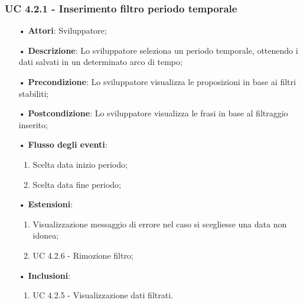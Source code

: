 \subsubsection{UC 4.2.1 - Inserimento filtro periodo temporale}
\begin{itemize}
\item[•]\textbf{Attori}: Sviluppatore;
\item[•]\textbf{Descrizione}: Lo sviluppatore seleziona un periodo temporale, ottenendo i dati salvati in un determinato arco di tempo;
\item[•]\textbf{Precondizione}: Lo sviluppatore visualizza le proposizioni in base ai filtri stabiliti;
\item[•]\textbf{Postcondizione}: Lo sviluppatore visualizza le frasi in base al filtraggio inserito;
\item[•]\textbf{Flusso degli eventi}: 
\begin{enumerate}
\item Scelta data inizio periodo;
\item Scelta data fine periodo;
\end{enumerate}
\item[•]\textbf{Estensioni}: 
\begin{enumerate}
	\item Visualizzazione messaggio di errore nel caso si scegliesse una data non idonea;
	\item UC 4.2.6 - Rimozione filtro;
\end{enumerate}
\item[•]\textbf{Inclusioni}:
\begin{enumerate}
\item UC 4.2.5 - Visualizzazione dati filtrati.
\end{enumerate}
\end{itemize}


